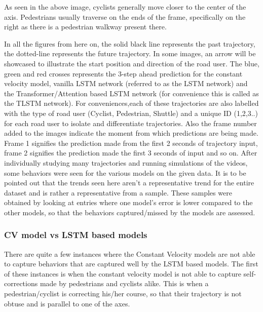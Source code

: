 \documentclass{article}
\begin{document}
As seen in the above image, cyclists generally  move closer to the center of the axis. Pedestrians usually traverse on the ends of the frame, specifically on the right as there is a pedestrian walkway present there. 


In all the figures from here on, the solid black line represents the past trajectory, the dotted-line represents the future trajectory. In some images, an arrow will be showcased to illustrate the start position and direction of the road user.  The blue, green and red crosses represents the 3-step ahead prediction for the constant velocity model, vanilla LSTM network (referred to as the LSTM network) and the Transformer/Attention based LSTM network (for convenience this is called as the TLSTM network). For conveniences,each of these trajectories are also labelled with the type of road user (Cyclist, Pedestrian, Shuttle) and a unique ID (1,2,3..) for each road user to isolate and differentiate trajectories. Also the frame number added to the images indicate the moment from which predictions are being made. Frame 1 signifies the  prediction made from the first 2 seconds of trajectory input, frame 2 signifies the prediction made the first 3 seconds of input and so on.
After individually studying many trajectories and running simulations of the videos, some behaviors were seen for the various models on the given data. It is to be pointed out that the trends seen here aren't a representative trend for the entire dataset and is rather a representative from a sample. These samples were obtained by looking at entries where one model's error is lower compared to the other models, so that the behaviors captured/missed by the models are assessed. 

\subsubsection{CV model vs LSTM based models}
There are quite a few instances where the Constant Velocity models are not able to capture behaviors that are captured well by the LSTM based models. The first of these instances is when the constant velocity model is not able to capture self-corrections made by pedestrians and cyclists alike. This is when a pedestrian/cyclist is correcting his/her course, so that their trajectory is not obtuse and is parallel to one of the axes.
\end{document}
